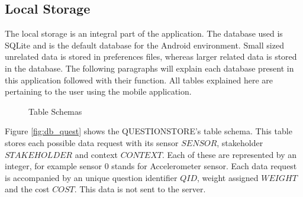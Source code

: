 \subsection{Local Storage} \label{loc}
The local storage is an integral part of the application. The database used is SQLite and is the default database
for the Android environment. Small sized unrelated data is stored in preferences files, whereas larger related
data is stored in the database. The following paragraphs will explain each database present in this application followed with 
their function. All tables explained here are pertaining to the user using the mobile application.

\begin{figure}[htp]
\hspace{1em}
\caption{Table Schemas}
\label{fig:ts1}
\end{figure}


Figure \ref{fig:db_quest} shows the QUESTIONSTORE's table schema. This table stores each possible data request with its sensor $SENSOR$, stakeholder  $STAKEHOLDER$ and context $CONTEXT$. Each of these are represented by an integer, for example sensor 0 stands for Accelerometer sensor. Each data request is accompanied by
an unique question identifier $QID$, weight assigned $WEIGHT$ and the cost $COST$. This data is not sent to 
the server.


